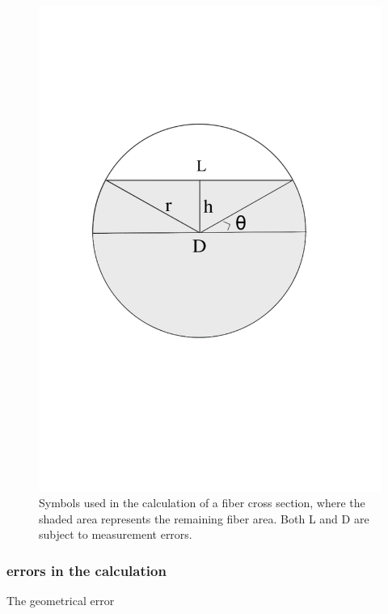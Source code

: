 \begin{figure}
    \centering
    \includegraphics[width=\textwidth]{fig/polishing/fiberdiagram.jpg}
    \caption{Symbols used in the calculation of a fiber cross section, where the shaded area represents the remaining fiber area. Both L and D are subject to measurement errors.}
    \label{fig:fiber}
\end{figure}
\subsubsection{errors in the calculation}
The geometrical error



